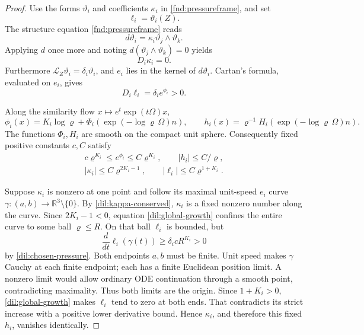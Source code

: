 \documentclass[11pt,a4paper]{article}
\numberwithin{equation}{section}
\theoremstyle{plain}
\theoremstyle{definition}
\theoremstyle{remark}
\begin{document}
\begin{proof}
Use the forms $\vartheta_i$ and coefficients $\kappa_i$ in
\eqref{fnd:pressureframe}, and set
\begin{equation}\label{dil:weighted-contact}
 \ell_i=\vartheta_i(Z).
\end{equation}
The structure equation \eqref{fnd:pressureframe} reads
\begin{equation}\label{dil:contact-structure}
                       d\vartheta_i=\kappa_i\vartheta_j\wedge\vartheta_k.
\end{equation}
Applying $d$ once more and noting
$d(\vartheta_j\wedge\vartheta_k)=0$ yields
\begin{equation}\label{dil:kappa-conserved}
                             D_i\kappa_i=0.
\end{equation}
Furthermore $\mathcal L_Z\vartheta_i=\delta_i\vartheta_i$, and
$e_i$ lies in the kernel of $d\vartheta_i$. Cartan's formula,
evaluated on $e_i$, gives
\begin{equation}\label{dil:eta-monotone}
                         D_i\ell_i=\delta_i e^{\phi_i}>0.
\end{equation}

Along the similarity flow $x\mapsto e^t\exp(t\Omega)x$,
\[
 \phi_i(x)=K_i\log\varrho+
           \Phi_i(\exp(-\log\varrho\,\Omega)n),\qquad
 h_i(x)=\varrho^{-1}H_i(\exp(-\log\varrho\,\Omega)n).
\]
The functions $\Phi_i,H_i$ are smooth on the compact unit sphere.
Consequently fixed positive constants $c,C$ satisfy
\begin{equation}\label{dil:global-growth}
 \begin{aligned}
 c\varrho^{K_i}\le e^{\phi_i}\le C\varrho^{K_i},\qquad
 |h_i|\le C/\varrho,\\
 |\kappa_i|\le C\varrho^{2K_i-1},\qquad
 |\ell_i|\le C\varrho^{1+K_i}.
 \end{aligned}
\end{equation}

Suppose $\kappa_i$ is nonzero at one point and follow its maximal
unit-speed $e_i$ curve $\gamma:(a,b)\to\mathbb R^3\setminus\{0\}$.
By \eqref{dil:kappa-conserved}, $\kappa_i$ is a fixed nonzero number
along the curve.  Since $2K_i-1<0$, equation
\eqref{dil:global-growth} confines the entire curve to some ball
$\varrho\le R$.  On that ball $\ell_i$ is bounded, but
\[
       \frac{d}{dt}\ell_i(\gamma(t))
                    \ge \delta_i cR^{K_i}>0
\]
by \eqref{dil:chosen-pressure}.  Both endpoints $a,b$ must be finite.
Unit speed makes $\gamma$ Cauchy at each finite endpoint; each has a
finite Euclidean position limit.  A nonzero limit would allow ordinary
ODE continuation through a smooth point, contradicting maximality.
Thus both limits are the origin.  Since $1+K_i>0$,
\eqref{dil:global-growth} makes $\ell_i$ tend to zero at both ends.
That contradicts its strict increase with a positive lower derivative
bound.  Hence $\kappa_i$, and therefore this fixed $h_i$, vanishes
identically.
\end{proof}
\end{document}
